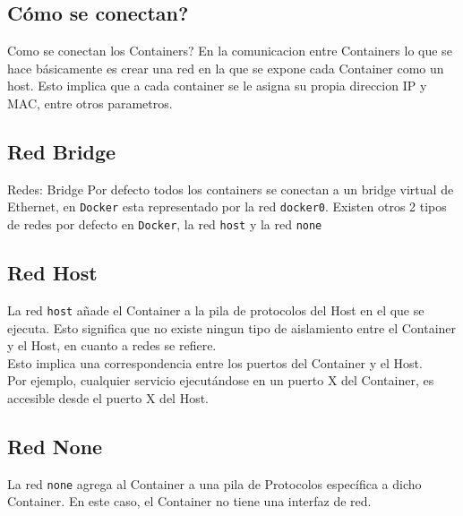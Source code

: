 \documentclass{beamer}
\begin{document}
\subsection{Cómo se conectan?}
\begin{frame}{Como se conectan los Containers?}
	En la comunicacion entre Containers lo que se hace básicamente es crear una red en la que se expone cada Container como un host. Esto implica que a cada container se le asigna su propia direccion IP y MAC, entre otros parametros.
\end{frame}

\subsection{Red Bridge}
\begin{frame}{Redes: Bridge}
Por defecto todos los containers se conectan a un bridge virtual de Ethernet, en \texttt{Docker} esta representado por la red \texttt{docker0}. Existen otros 2 tipos de redes por defecto en \texttt{Docker}, la red \texttt{host} y la red \texttt{none}
\end{frame}

\subsection{Red Host}

\begin{frame}
\hspace{1cm} La red \texttt{host} añade el Container a la pila de protocolos del Host en el que se ejecuta. Esto significa que no existe ningun tipo de aislamiento entre el Container y el Host, en cuanto a redes se refiere.\\

\hspace{1cm} Esto implica una correspondencia entre los puertos del Container y el Host. \\

\hspace{1cm} Por ejemplo, cualquier servicio ejecutándose en un puerto X del Container, es accesible desde el puerto X del Host. 
\end{frame}

\subsection{Red None}

\begin{frame}
	La red \texttt{none} agrega al Container a una pila de Protocolos específica a dicho Container. En este caso, el Container no tiene una interfaz de red.
\end{frame}
\end{document}
